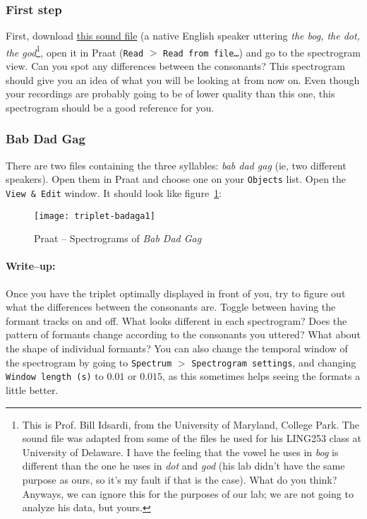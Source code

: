 \documentclass{article}
\newcommand{\soft}[1]{\textsf{#1}}
\newcommand{\softmenu}[1]{\texttt{#1}}
\newcommand{\Praat}{\soft{Praat}}
\begin{document}
\subsubsection{First step}

First, download \href{http://www.ling.umd.edu/~diogo/courses/ling499a/thebog-thedot-thegod.wav}{this sound file} (a native English speaker uttering \emph{the bog, the dot, the god}\footnote{This is Prof. Bill Idsardi, from the University of Maryland, College Park. The sound file was adapted from some of the files he used for his LING253 class at University of Delaware. I have the feeling that the vowel he uses in \emph{bog} is different than the one he uses in \emph{dot} and \emph{god} (his lab didn't have the same purpose as ours, so it's my fault if that is the case). What do you think? Anyways, we can ignore this for the purposes of our lab; we are not going to analyze his data, but yours.}, open it in \Praat{} (\softmenu{Read} $>$ \softmenu{Read from file\ldots}) and go to the spectrogram view. Can you spot any differences between the consonants? This spectrogram should give you an idea of what you will be looking at from now on. Even though your recordings are probably going to be of lower quality than this one, this spectrogram should be a good reference for you.

\subsubsection{Bab Dad Gag}

There are two files containing the three syllables: \emph{bab dad gag} (ie, two different speakers). Open them in \Praat{} and choose one on your \softmenu{Objects} list. Open the \softmenu{View \& Edit} window. It should look like figure~\ref{step1triplet}:

\begin{figure}[!tbp]
\caption{\Praat{} -- Spectrograms of \emph{Bab Dad Gag}}
\label{step1triplet}
	\begin{center}
		\texttt{[image: triplet-badaga1]}
	\end{center}
\end{figure}

\paragraph{Write--up:} Once you have the triplet optimally displayed in front of you, try to figure out what the differences between the consonants are. Toggle between having the formant tracks on and off. What looks different in each spectrogram? Does the pattern of formants change according to the consonants you uttered? What about the shape of individual formants? You can also change the temporal window of the spectrogram by going to \softmenu{Spectrum} $>$ \softmenu{Spectrogram settings}, and changing \softmenu{Window length (s)} to $0.01$ or $0.015$, as this sometimes helps seeing the formats a little better.
\end{document}
